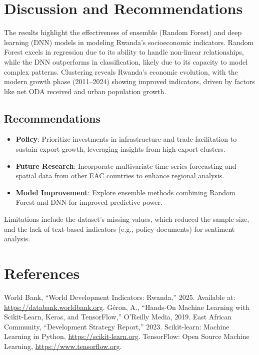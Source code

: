 \documentclass[12pt]{article}
\begin{document}
	\section{Discussion and Recommendations}
	The results highlight the effectiveness of ensemble (Random Forest) and deep learning (DNN) models in modeling Rwanda's socioeconomic indicators. Random Forest excels in regression due to its ability to handle non-linear relationships, while the DNN outperforms in classification, likely due to its capacity to model complex patterns. Clustering reveals Rwanda's economic evolution, with the modern growth phase (2011–2024) showing improved indicators, driven by factors like net ODA received and urban population growth.
	
	\subsection{Recommendations}
	\begin{itemize}
		\item \textbf{Policy}: Prioritize investments in infrastructure and trade facilitation to sustain export growth, leveraging insights from high-export clusters.
		\item \textbf{Future Research}: Incorporate multivariate time-series forecasting and spatial data from other EAC countries to enhance regional analysis.
		\item \textbf{Model Improvement}: Explore ensemble methods combining Random Forest and DNN for improved predictive power.
	\end{itemize}
	Limitations include the dataset's missing values, which reduced the sample size, and the lack of text-based indicators (e.g., policy documents) for sentiment analysis.
	
	\section{References}
	
	\begin{thebibliography}{9}
		World Bank, ``World Development Indicators: Rwanda,'' 2025. Available at: \url{https://databank.worldbank.org}.
		Géron, A., ``Hands-On Machine Learning with Scikit-Learn, Keras, and TensorFlow,'' O'Reilly Media, 2019.
		East African Community, ``Development Strategy Report,'' 2023.
		Scikit-learn: Machine Learning in Python, \url{https://scikit-learn.org}.
		TensorFlow: Open Source Machine Learning, \url{https://www.tensorflow.org}.
	\end{thebibliography}
	
\end{document}
